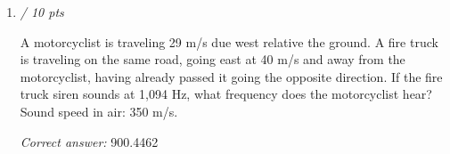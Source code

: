 \documentclass[11pt]{article}
\begin{document}
\begin{enumerate}[leftmargin=*,label=\textbf{Question \arabic*.}]
A pipe open at both ends has a length of 1 m. If the temperature of the room is 12°C, calculate the frequency in Hz of the \emph{n} = 1 harmonic.

Take the speed of sound to be $v=(331\;\mathrm{m/s})\sqrt{\frac{T}{273\;\mathrm{K}}}$ .

\textit{Correct answer: } 169.0982

\item \hfill \textit{/ 10 pts}

A motorcyclist is traveling 29 m/s due west relative the ground. A fire truck is traveling on the same road, going east at 40 m/s and away from the motorcyclist, having already passed it going the opposite direction. If the fire truck siren sounds at 1,094 Hz, what frequency does the motorcyclist hear? Sound speed in air: 350 m/s.

\textit{Correct answer: } 900.4462

\end{enumerate}
\end{document}
